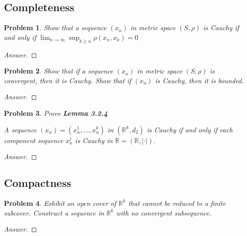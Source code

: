 \documentclass{article}
\newtheorem{problem}{Problem}
\begin{document}
\subsection{Completeness}

\begin{problem} Show that a sequence $\left(x_{n}\right)$ in metric space $(S, \rho)$ is Cauchy if and only if $\lim _{n \rightarrow \infty} \sup _{k \geq n} \rho\left(x_{n}, x_{k}\right)=0$
\end{problem}

\begin{proof}[Answer]
    
\end{proof}

\begin{problem}Show that if a sequence $\left(x_{n}\right)$ in metric space $(S, \rho)$ is convergent, then it is Cauchy. Show that if $\left(x_{n}\right)$ is Cauchy, then it is bounded.
\end{problem}

\begin{proof}[Answer]
    
\end{proof}

\begin{problem} Prove \textbf{Lemma 3.2.4}
    
    A sequence $\left(x_{n}\right)=\left(x_{n}^{1}, \ldots, x_{n}^{k}\right)$ in $\left(\mathbb{R}^{k}, d_{2}\right)$ is Cauchy if and only if each component sequence $x_{n}^{j}$ is Cauchy in $\mathbb{R}=(\mathbb{R},|\cdot|) .$
\end{problem}

\begin{proof}[Answer]
    
\end{proof}

\subsection{Compactness}

\begin{problem}Exhibit an open cover of $\mathbb{R}^{k}$ that cannot be reduced to a finite subcover. Construct a sequence in $\mathbb{R}^{k}$ with no convergent subsequence.
\end{problem}

\begin{proof}[Answer]
    
\end{proof}
\end{document}

